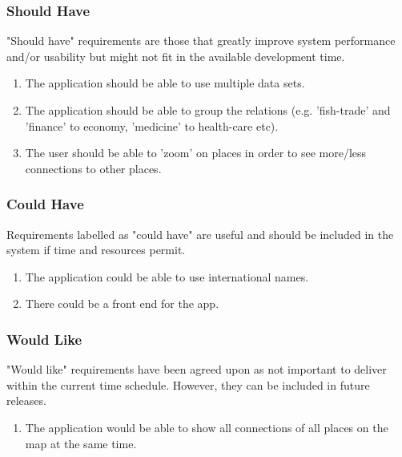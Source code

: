 \subsubsection {Should Have}
"Should have" requirements are those that greatly improve system performance and/or usability but might not fit in the available development time.

\begin{enumerate}
    \item The application should be able to use multiple data sets.
    \item The application should be able to group the relations (e.g. 'fish-trade' and 'finance' to economy, 'medicine' to health-care etc).
    \item The user should be able to 'zoom' on places in order to see more/less connections to other places.
\end{enumerate}

\subsubsection {Could Have}
Requirements labelled as "could have" are useful and should be included in the system if time and resources permit.

\begin{enumerate}
    \item The application could be able to use international names.
    \item There could be a front end for the app.
\end{enumerate}

\subsubsection {Would Like}
"Would like" requirements have been agreed upon as not important to deliver within the current time schedule. However, they can be included in future releases.

\begin{enumerate}
    \item The application would be able to show all connections of all places on the map at the same time.
\end{enumerate}

